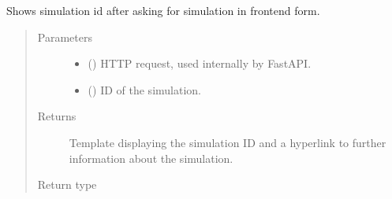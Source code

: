 \documentclass[a4paper,landscape,10pt,english]{sphinxmanual}
\begin{document}
\begin{fulllineitems}
\label{\detokenize{code_docs/simulation_API.controller:simulation_API.controller.main.simulate_id_sim_id}}
Shows simulation id after asking for simulation in frontend form.
\begin{quote}\begin{description}
\item[{Parameters}] \leavevmode\begin{itemize}
\item {} 
 () \textendash{} HTTP request, used internally by FastAPI.

\item {} 
 () \textendash{} ID of the simulation.

\end{itemize}

\item[{Returns}] \leavevmode
Template displaying the simulation ID and a hyperlink to
further information about the simulation.

\item[{Return type}] \leavevmode
{}

\end{description}\end{quote}

\end{fulllineitems}

\end{document}

